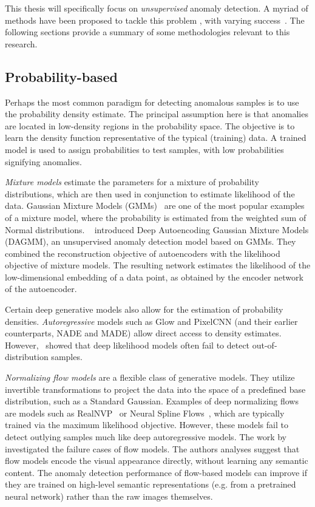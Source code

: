 This thesis will specifically focus on \textit{unsupervised} anomaly detection. A myriad of methods have been proposed to tackle this problem \cite{pang_deep_2021,ruff_unifying_2021}, with varying success~\cite{han2022adbench}. The following sections provide a summary of some methodologies relevant to this research.

\subsection*{Probability-based}


Perhaps the most common paradigm for detecting anomalous samples is to use the probability density estimate. The principal assumption here is that anomalies are located in low-density regions in the probability space. The objective is to learn the density function representative of the typical (training) data. A trained model is used to assign probabilities to test samples, with low probabilities signifying anomalies.

\textit{Mixture models} estimate the parameters for a mixture of probability distributions, which are then used in conjunction to estimate likelihood of the data. Gaussian Mixture Models (GMMs)~\cite{reynolds2009gaussian} are one of the most popular examples of a mixture model, where the probability is estimated from the weighted sum of Normal distributions. ~\cite{zong2018deep} introduced Deep Autoencoding Gaussian Mixture Models (DAGMM), an unsupervised anomaly detection model based on GMMs. They combined the reconstruction objective of autoencoders with the likelihood objective of mixture models. The resulting network estimates the likelihood of the low-dimensional embedding of a data point, as obtained by the encoder network of the autoencoder. 

Certain deep generative models also allow for the estimation of probability densities. \textit{Autoregressive} models such as Glow and PixelCNN (and their earlier counterparts, NADE and MADE) allow direct access to density estimates. However,~\cite{nalisnick2018do} showed that deep likelihood models often fail to detect out-of-distribution samples.

\textit{Normalizing flow models} are a flexible class of generative models. They utilize invertible transformations to project the data into the space of a predefined base distribution, such as a Standard Gaussian. Examples of deep normalizing flows are models such as RealNVP~\cite{dinh2017density} or Neural Spline Flows~\cite{NEURIPS2019_7ac71d43}, which are typically trained via the maximum likelihood objective. However, these models fail to detect outlying samples much like deep autoregressive models. The work by ~\cite{normflow_fails} investigated the failure cases of flow models. The authors analyses suggest that flow models encode the visual appearance directly, without learning any semantic content. The anomaly detection performance of flow-based models can improve if they are trained on high-level semantic representations (e.g. from a pretrained neural network) rather than the raw images themselves. 


